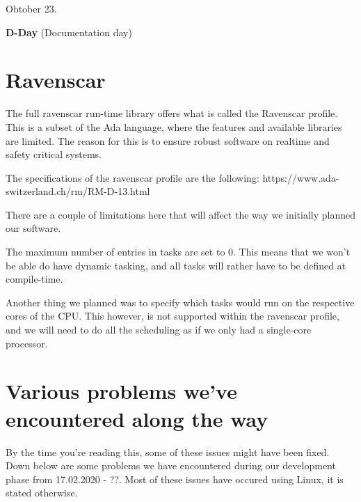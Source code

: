 \documentclass{article}
\begin{document}
\vspace{5mm}

Obtober 23.

\textbf{D-Day} (Documentation day)

\section{Ravenscar}

The full ravenscar run-time library offers what is called the Ravenscar profile. This is a subset of the Ada language, where the features and available libraries are limited. The reason for this is to ensure robust software on realtime and safety critical systems. 

The specifications of the ravenscar profile are the following:
https://www.ada-switzerland.ch/rm/RM-D-13.html

There are a couple of limitations here that will affect the way we initially planned our software. 

The maximum number of entries in tasks are set to 0. This means that we won't be able do have dynamic tasking, and all tasks will rather have to be defined at compile-time. 

Another thing we planned was to specify which tasks would run on the respective cores of the CPU. This however, is not supported within the ravenscar profile, and we will need to do all the scheduling as if we only had a single-core processor. 

\section{Various problems we've encountered along the way}

By the time you're reading this, some of these issues might have been fixed. Down below are some problems we have encountered during our development phase from 17.02.2020 - ??. Most of these issues have occured using Linux, it is stated otherwise.
\end{document}
